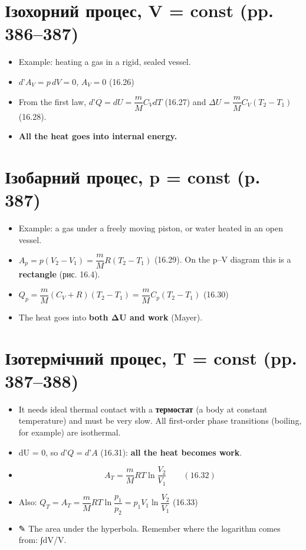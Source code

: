 \documentclass[11pt,a4paper,oneside]{book}
\newcommand{\pen}{{\sffamily\color{accent}✎}}
\begin{document}
\section*{Ізохорний процес, V = const (pp. 386–387)}
\begin{itemize}
\item Example: heating a gas in a rigid, sealed vessel.
\item $d\text{'}A_V = p\,dV = 0$, $A_V = 0$ (16.26)
\item From the first law, $d\text{'}Q = dU = \dfrac mMC_VdT$ (16.27) and $\Delta U = \dfrac mMC_V(T_2 - T_1)$ (16.28).
\item \textbf{All the heat goes into internal energy.}
\end{itemize}

\section*{Ізобарний процес, p = const (p. 387)}
\begin{itemize}
\item Example: a gas under a freely moving piston, or water heated in an open vessel.
\item $A_p = p(V_2 - V_1) = \dfrac mMR(T_2 - T_1)$ (16.29). On the p–V diagram this is a \textbf{rectangle} (рис. 16.4).
\item $Q_p = \dfrac mM(C_V + R)(T_2 - T_1) = \dfrac mMC_p(T_2 - T_1)$ (16.30)
\item The heat goes into \textbf{both ΔU and work} (Mayer).
\end{itemize}

\section*{Ізотермічний процес, T = const (pp. 387–388)}
\begin{itemize}
\item It needs ideal thermal contact with a \textbf{термостат} (a body at constant temperature) and must be very slow. All first-order phase transitions (boiling, for example) are isothermal.
\item dU = 0, so $d\text{'}Q = d\text{'}A$ (16.31): \textbf{all the heat becomes work}.
\item \[A_T = \frac mMRT\ln\frac{V_2}{V_1}\qquad(16.32)\]
\item Also: $Q_T = A_T = \dfrac mMRT\ln\dfrac{p_1}{p_2} = p_1V_1\ln\dfrac{V_2}{V_1}$ (16.33)
\item \pen{} The area under the hyperbola. Remember where the logarithm comes from: ∫dV/V.
\end{itemize}
\end{document}
